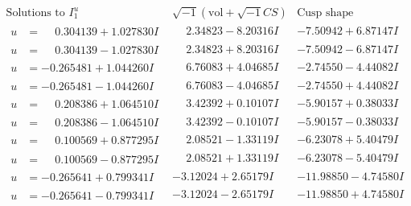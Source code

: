 \documentclass[1p]{elsarticle_modified}
\theoremstyle{definition}
\newcommand{\I}{\sqrt{-1}}
\begin{document}
$$\begin{array}{c|c|c}  
\text{Solutions to }I^u_{1}& \I (\text{vol} + \sqrt{-1}CS) & \text{Cusp shape}\\
 \hline 
\begin{aligned}
u &= \phantom{-}0.304139 + 1.027830 I\end{aligned}
 & \phantom{-}2.34823 - 8.20316 I & -7.50942 + 6.87147 I \\ \hline\begin{aligned}
u &= \phantom{-}0.304139 - 1.027830 I\end{aligned}
 & \phantom{-}2.34823 + 8.20316 I & -7.50942 - 6.87147 I \\ \hline\begin{aligned}
u &= -0.265481 + 1.044260 I\end{aligned}
 & \phantom{-}6.76083 + 4.04685 I & -2.74550 - 4.44082 I \\ \hline\begin{aligned}
u &= -0.265481 - 1.044260 I\end{aligned}
 & \phantom{-}6.76083 - 4.04685 I & -2.74550 + 4.44082 I \\ \hline\begin{aligned}
u &= \phantom{-}0.208386 + 1.064510 I\end{aligned}
 & \phantom{-}3.42392 + 0.10107 I & -5.90157 + 0.38033 I \\ \hline\begin{aligned}
u &= \phantom{-}0.208386 - 1.064510 I\end{aligned}
 & \phantom{-}3.42392 - 0.10107 I & -5.90157 - 0.38033 I \\ \hline\begin{aligned}
u &= \phantom{-}0.100569 + 0.877295 I\end{aligned}
 & \phantom{-}2.08521 - 1.33119 I & -6.23078 + 5.40479 I \\ \hline\begin{aligned}
u &= \phantom{-}0.100569 - 0.877295 I\end{aligned}
 & \phantom{-}2.08521 + 1.33119 I & -6.23078 - 5.40479 I \\ \hline\begin{aligned}
u &= -0.265641 + 0.799341 I\end{aligned}
 & -3.12024 + 2.65179 I & -11.98850 - 4.74580 I \\ \hline\begin{aligned}
u &= -0.265641 - 0.799341 I\end{aligned}
 & -3.12024 - 2.65179 I & -11.98850 + 4.74580 I \\ \hline\begin{aligned}

\end{aligned}
\end{array}$$
\end{document}
